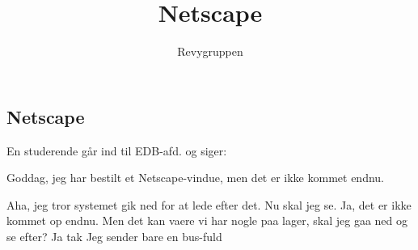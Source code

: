 \documentclass[danish]{article}
\title{Netscape}
\author{Revygruppen}
\begin{document}
\maketitle

\begin{sketch}

\subsection*{Netscape}

En studerende går ind til EDB-afd. og siger:

 Goddag, jeg har bestilt et Netscape-vindue, men det er ikke
kommet endnu.

 Aha, jeg tror systemet gik ned for at lede efter det. Nu skal jeg
se. Ja, det er ikke kommet op endnu. Men det kan vaere vi har nogle
paa lager, skal jeg gaa ned og se efter?
 Ja tak
 Jeg sender bare en bus-fuld

\end{sketch}
\end{document}
